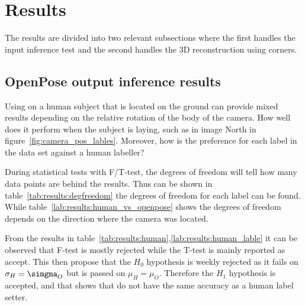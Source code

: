 \section{Results}\label{sec:results}


The results are divided into two relevant subsections where the first handles the input inference test and the second handles the 3D reconstruction using \aruco corners.
\subsection{OpenPose output inference results}%
\label{sub:res:op_inference}
Using \openpose{ } on a human subject that is located on the ground can provide mixed results depending on the relative rotation of the body of the camera.
How well does it perform when the subject is laying, such as in image North in figure~\ref{fig:camera_pos_lables}.
Moreover, how is the preference for each label in the \operpose{ } data set against a human labeller?

During statistical tests with F/T-test, the degrees of freedom will tell how many data points are behind the results.
Thus can be shown in table~\ref{tab:results:degfreedom} the degrees of freedom for each label can be found.
While table~\ref{lab:results:human_vs_openpose} shows the degrees of freedom depends on the direction where the camera was located.

From the results in table~\ref{tab:results:human},\ref{lab:results:human_lable} it can be observed that F-test is mostly rejected while the T-test is mainly reported as accept.
This then propose that the $H_0$ hypothesis is weekly rejected as it fails on $\sigma_H = \simgma_O$ but is passed on $\mu_H = \mu_O$.
Therefore the $H_1$ hypothesis is accepted, and that shows that \openpose{ } do not have the same accuracy as a human label setter.




